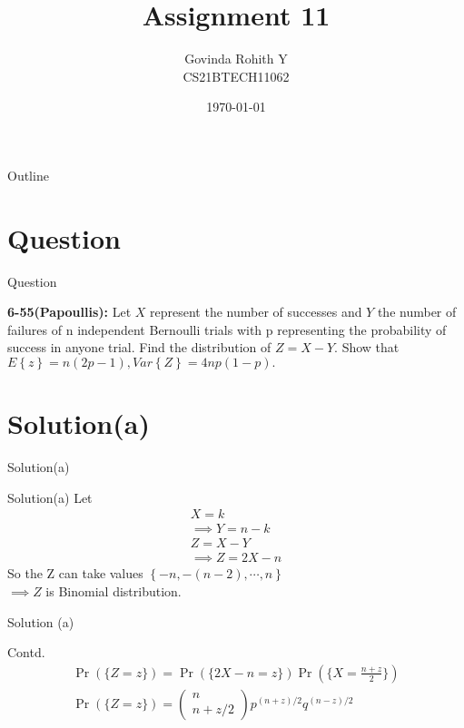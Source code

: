 \documentclass{beamer}
\title{Assignment 11}
\author{Govinda Rohith Y\\CS21BTECH11062}
\date{\today}
\providecommand{\pr}[1]{\ensuremath{\Pr\left(#1\right)}}
\providecommand{\cbrak}[1]{\ensuremath{\left\{#1\right\}}}
\newcommand{\myvec}[1]{\ensuremath{\begin{pmatrix}#1\end{pmatrix}}}
\begin{document}
\begin{frame}
    \titlepage 
\end{frame}

\logo{}


\begin{frame}{Outline}
    \tableofcontents
\end{frame}


\section{Question}
\begin{frame}{Question}

\begin{block}{\textbf{6-55(Papoullis):}}
         Let $X$ represent the number of successes and $Y$ the number of failures of n independent
Bernoulli trials with p representing the probability of success in anyone trial. Find the distribution of $Z =X -Y$. Show that $E\cbrak{z} = n(2p - 1), Var\cbrak{Z} = 4np(1 - p). $
    \end{block}

\end{frame}
\section{Solution(a)}
\begin{frame}{Solution(a)}
    \begin{block}{Solution(a)}
    Let 
    \begin{align}
        X=k\\
        \implies Y=n-k\\
        Z=X-Y\\
        \implies \boxed{Z=2X-n}
    \end{align}
    So the Z can take values $\cbrak{-n,-(n-2),\cdots,n}$\\
    $\implies Z$ is Binomial distribution.
    \end{block}
\end{frame}
\begin{frame}{Solution (a)}
    \begin{block}{Contd.}
    \begin{align}
        \pr{\{ Z=z \}}=\pr{\{2X-n=z\}}\pr{\{X=\frac{n+z}{2}\}}\\
        \pr{\{Z=z\}}=\myvec{n\\n+z/2}p^{{(n+z)}/2} q^{{(n-z)}/2}
    \end{align}
    \end{block}
\end{frame}
\end{document}
